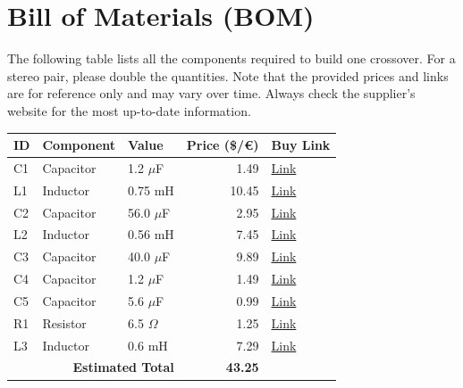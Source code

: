 \documentclass[11pt,a4paper]{report}
\begin{document}
\chapter{Bill of Materials (BOM)}
The following table lists all the components required to build one crossover. For a stereo pair, please double the quantities. Note that the provided prices and links are for reference only and may vary over time. Always check the supplier's website for the most up-to-date information.

\vspace{0.5cm}
\begin{table}[H]
    \centering
    \renewcommand{\arraystretch}{1.5}
    \begin{tabular}{@{}lllrl@{}}
        \toprule
        \textbf{ID} & \textbf{Component} & \textbf{Value} & \textbf{Price (\$/€)} & \textbf{Buy Link} \\
        \midrule
        C1 & Capacitor & 1.2 $\mu$F & 1.49 & \href{https://www.soundimports.eu/en/jantzen-audio-001-0234.html}{Link} \\
        L1 & Inductor & 0.75 mH & 10.45 & \href{https://www.soundimports.eu/en/jantzen-audio-000-1075.html}{Link} \\
        C2 & Capacitor & 56.0 $\mu$F & 2.95 & \href{https://www.soundimports.eu/en/jantzen-audio-001-6162.html}{Link} \\
        L2 & Inductor & 0.56 mH & 7.45 & \href{https://www.soundimports.eu/en/jantzen-audio-000-2377.html}{Link} \\
        C3 & Capacitor & 40.0 $\mu$F & 9.89 & \href{https://www.parts-express.com/Dayton-Audio-PMPC-40-40uF-250V-Precision-Audio-Capacitor-027-260}{Link} \\
        C4 & Capacitor & 1.2 $\mu$F & 1.49 & \href{https://www.soundimports.eu/en/jantzen-audio-001-0234.html}{Link} \\
        C5 & Capacitor & 5.6 $\mu$F & 0.99 & \href{https://www.parts-express.com/5.6uF-100V-Non-Polarized-Capacitor-027-334}{Link} \\
        R1 & Resistor & 6.5 $\Omega$ & 1.25 & \href{https://www.parts-express.com/Dayton-Audio-DNR-6.5-6.5-Ohm-10W-Precision-Audio-Grade-Resis-004-6.5}{Link} \\
        L3 & Inductor & 0.6 mH & 7.29 & \href{https://www.parts-express.com/Jantzen-1951-0.60mH-18-AWG-Air-Core-Inductor-255-234}{Link} \\
        \midrule
        \multicolumn{3}{r}{\textbf{Estimated Total}} & \textbf{43.25} & \\
        \bottomrule
    \end{tabular}
\end{table}
\end{document}
